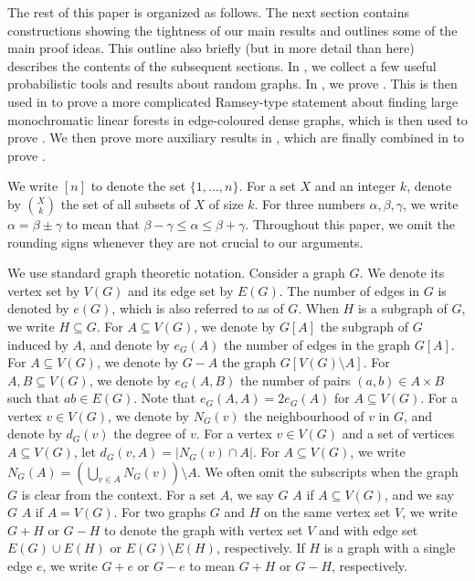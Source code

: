 \documentclass[10pt,a4paper,reqno]{amsart}
\begin{document}
\begin{organization*}
The rest of this paper is organized as follows. The next section contains constructions showing the tightness of our main results and outlines some of the main proof ideas. This outline also briefly (but in more detail than here) describes the contents of the subsequent sections. In , we collect a few useful probabilistic tools and results about random graphs. In , we prove . This is then used in  to prove a more complicated Ramsey-type statement about finding large monochromatic linear forests in edge-coloured dense graphs, which is then used to prove . We then prove more auxiliary results in , which are finally combined in  to prove .
\end{organization*}


\begin{notation*}
  We write $[n]$ to denote the set $\{1,\dots,n\}$. For a set $X$ and an integer $k$, denote by $\binom{X}{k}$ the set of all subsets of $X$ of size $k$. 
  For three numbers $\alpha,\beta,\gamma$, we write $\alpha=\beta\pm \gamma$ to mean that $\beta-\gamma\le \alpha \le \beta+\gamma$. 
  Throughout this paper, we omit the rounding signs whenever they are not crucial to our arguments.


  We use standard graph theoretic notation. Consider a graph $G$. We denote its
  vertex set by $V(G)$ and its edge set by $E(G)$. The number of edges in $G$ is denoted by $e(G)$, which is also referred to as  of $G$. When $H$ is a subgraph of $G$, we write $H\subseteq G$.
  For $A\subseteq V(G)$, we denote by $G[A]$ the subgraph of $G$ induced by $A$, and denote by $e_G(A)$ the number of edges in the graph $G[A]$. For $A\subseteq V(G)$, we denote by $G-A$ the graph $G[V(G)\setminus A]$.
  For $A,B\subseteq V(G)$, we denote by $e_G(A,B)$ the number of pairs $(a,b)\in A\times B$ such that $ab\in E(G)$. Note that $e_G(A,A) = 2e_G(A)$ for $A\subseteq V(G)$.
  For a vertex $v\in V(G)$, we denote by $N_G(v)$ the neighbourhood of $v$ in $G$, and denote by $d_G(v)$ the degree of $v$. 
  For a vertex $v\in V(G)$ and a set of vertices $A \subseteq V(G)$, let $d_G(v, A) = |N_G(v) \cap A|$. 
  For $A\subseteq V(G)$, we write $N_G(A) = (\bigcup_{v\in A} N_G(v))\setminus A$. We often omit the subscripts when the graph $G$ is clear from the context.
  For a set $A$, we say $G$  $A$ if $A\subseteq V(G)$, and we say $G$  $A$ if $A=V(G)$.
  For two graphs $G$ and $H$ on the same vertex set $V$, we write $G + H$ or $G - H$ to denote the graph with vertex set $V$ and with edge set $E(G)\cup E(H)$ or $E(G)\setminus E(H)$, respectively. If $H$ is a graph with a single edge $e$, we write $G + e$ or $G - e$ to mean $G + H$ or $G - H$, respectively.
\end{notation*}
\end{document}
